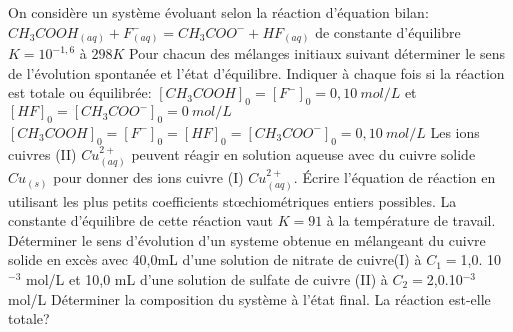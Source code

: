 \begin{Exercise}[title=Évolution et équilibre]
\ExePart[title={Réaction acide-base}]
 On considère un système évoluant selon la réaction d'équation bilan: $CH_3COOH_{(aq)} +F^-_{(aq)} = CH_3COO^- + HF_{(aq)}$ de constante d'équilibre $K=10^{-1,6}$ à $298K$
Pour chacun des mélanges initiaux suivant déterminer le sens de l'évolution spontanée et l'état d'équilibre. Indiquer à chaque fois si la réaction est totale ou équilibrée:
	\Question $[CH_3COOH]_0= [F^-]_0 = 0,10 ~ mol/L$ et $[HF]_0=[CH_3COO^-]_0 = 0 ~ mol/L$
	\Question $ [CH_3COOH]_0= [F^-]_0 =[HF]_0=[CH_3COO^-]_0 =  0,10 ~ mol/L $
\ExePart[title={Réaction d'oxydo-réduction}]
	Les ions cuivres (II) $Cu^{2+}_{(aq)}$ peuvent réagir en solution aqueuse avec du cuivre solide $Cu_(s)$ pour donner des ions cuivre (I) $Cu^{2+}_{(aq)}$.
	\Question Écrire l'équation de réaction en utilisant les plus petits coefficients stœchiométriques entiers possibles.
	La constante d'équilibre de cette réaction vaut $K=91$ à  la température de travail.
	\Question Déterminer le sens d'évolution d'un systeme obtenue en mélangeant du cuivre solide en excès avec 40,0mL d'une solution de nitrate de cuivre(I) à $C_1= $1,0. 10$^{-3}$ mol/L et 10,0 mL d'une solution de sulfate de cuivre (II) à $C_2= $2,0.10$^{-3}$ mol/L
	\Question Déterminer la composition du système à l'état final. La réaction est-elle totale?
\end{Exercise}
